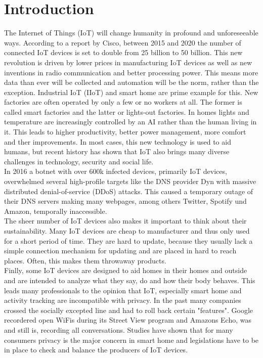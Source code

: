 \section{Introduction}
The Internet of Things (IoT) will change humanity in profound and unforeseeable ways\cite{ciscoReport}. According to a report by Cisco, between 2015 and 2020 the number of connected IoT devices is set to double from 25 billion to 50 billion\cite{ciscoReport}. This new revolution is driven by lower prices in manufacturing IoT devices as well as new inventions in radio communication and better processing power. This means more data than ever will be collected and automation will be the norm, rather than the exception. Industrial IoT (IIoT) and smart home are prime example for this. New factories are often operated by only a few or no workers at all. The former is called smart factories and the latter or lights-out factories\cite{smartVSLightoutFactories:online}. In homes lights and temperature are increasingly controlled by an AI rather than the human living in it. This leads to higher productivity, better power management, more comfort and ther improvements. In most cases, this new technology is used to aid humans, but recent history has shown that IoT also brings many diverse challenges in technology, security and social life.\\

In 2016 a botnet with over 600k infected devices, primarily IoT devices, overwhelmed several high-profile targets like the DNS provider Dyn with massive distributed denial-of-service (DDoS) attacks. This caused a temporary outage of their DNS servers making many webpages, among others  Twitter, Spotify und Amazon, temporally inaccessible.\\

The sheer number of IoT devices also makes it important to think about their sustainability. Many IoT devices are cheap to manufacturer and thus only used for a short period of time. They are hard to update, because they usually lack a simple connection mechanism for updating and are placed in hard to reach places. Often, this makes them throwaway products.\\

Finlly, some IoT devices are designed to aid homes in their homes and outside and are intended to analyze what they say, do and how their body behaves. This leads many professionals to the opinion that IoT, especially smart home and activity tracking are incompatible with privacy\cite{5Reasons41:online}. In the past many companies crossed the socially excepted line and had to roll back certain "features"\cite{PrivacyIoT50:online}. Google recordered open WiFis during its Street View program and Amazons Echo, was and still is, recording all conversations. Studies have shown that for many consumers privacy is the major concern in smart home\cite{PrivacyIoT50:online} and legislations have to be in place to check and balance the producers of IoT devices.\\

